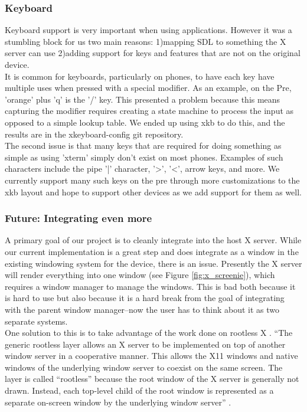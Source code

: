 \subsubsection{Keyboard}
Keyboard support is very important when using applications.  However it was a stumbling block for us two main reasons: 1)mapping SDL to something the X server can use 2)adding support for keys and features that are not on the original device.\\
It is common for keyboards, particularly on phones, to have each key have multiple uses when pressed with a special modifier.  As an example, on the Pre, 'orange' plus 'q' is the '/' key.  This presented a problem because this means capturing the modifier requires creating a state machine to process the input as opposed to a simple lookup table.  We ended up using xkb to do this, and the results are in the xkeyboard-config git repository. \\
The second issue is that many keys that are required for doing something as simple as using 'xterm' simply don't exist on most phones.  Examples of such characters include the pipe '|' character, '>', '<', arrow keys, and more.  We currently support many such keys on the pre through more customizations to the xkb layout and hope to support other devices as we add support for them as well.
\subsubsection{Future: Integrating even more}
A primary goal of our project is to cleanly integrate into the host X server.  While our current implementation is a great step and does integrate as a window in the existing windowing system for the device, there is an issue.  Presently the X server will render everything into one window (see Figure \ref{fig:x_screenie}), which requires a window manager to manage the windows.  This is bad both because it is hard to use but also because it is a hard break from the goal of integrating with the parent window manager--now the user has to think about it as two separate systems.\\

One solution to this is to take advantage of the work done on rootless X \cite{rootless}.  ``The generic rootless layer allows an X server to be implemented on top of another window server in a cooperative manner. This allows the X11 windows and native windows of the underlying window server to coexist on the same screen. The layer is called ``rootless'' because the root window of the X server is generally not drawn. Instead, each top-level child of the root window is represented as a separate on-screen window by the underlying window server'' \cite{rootless}.\\


